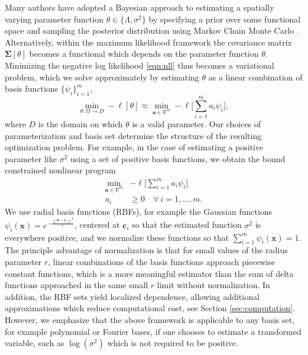 \documentclass{article}
\newcommand{\norm}[1]{\left\lVert#1\right\rVert}
\newcommand{\R}{\mathbb{R}}
\numberwithin{equation}{section}
\newcommand{\cm}{\bm{\Sigma}}
\newcommand{\x}{\bm{x}}
\newcommand{\a}{\bm{a}}
\renewcommand{\c}{\bm{c}}
\begin{document}
Many authors have adopted a Bayesian approach to estimating a spatially varying parameter function $\theta \in \{\Lambda, \sigma^2\}$ by specifying a prior over some functional space and sampling the posterior distribution using Markov Chain Monte Carlo \cite{risser2015regression, gibbs1997bayesian, paciorek2004nonstationary, paciorek2006spatial, higdon1998process}. Alternatively, within the maximum likelihood framework the covariance matrix $\cm[\theta]$ becomes a functional which depends on the parameter function $\theta$. Minimizing the negative log likelihood \ref{eqn:nll} thus becomes a variational problem, which we solve approximately by estimating $\theta$ as a linear combination of basis functions $\{ \psi_i\}_{i=1}^m$,
\begin{equation}
  \min_{\theta : \Omega \to D} -\ell[\theta] \approx \min_{\a \in \R^m} -\ell\Bigg[\sum_{i=1}^m a_i \psi_i\Bigg],
  \label{eqn:var}
\end{equation}
where $D$ is the domain on which $\theta$ is a valid parameter. Our choices of parameterization and basis set determine the structure of the resulting optimization problem. For example, in the case of estimating a positive parameter like $\sigma^2$ using a set of positive basis functions, we obtain the bound constrained nonlinear program
\begin{equation}
  \begin{aligned}
    \min_{\a \in \R^m} & -\ell\Bigg[ \sum_{i=1}^m a_i \psi_i \Bigg] \\
    a_i & \geq 0 \quad \forall \ i=1,...,m.
    \label{eqn:opt}
  \end{aligned}
\end{equation}
We use radial basis functions (RBFs), for example the Gaussian functions $\psi_i(\x) = e^{-\frac{\norm{\x - \c_i}^2}{r}}$, centered at $\c_i$ so that the estimated function $\sigma^2$ is everywhere positive, and we normalize these functions so that $\sum_{i=1}^m \psi_i(\x) = 1$. The principle advantage of normalization is that for small values of the radius parameter $r$, linear combinations of the basis functions approach piecewise constant functions, which is a more meaningful estimator than the sum of delta functions approached in the same small $r$ limit without normalization. In addition, the RBF sets yield localized dependence, allowing additional approximations which reduce computational cost, see Section \ref{sec:computation}. However, we emphasize that the above framework is applicable to any basis set, for example polynomial or Fourier bases, if one chooses to estimate a transformed variable, such as $\log(\sigma^2)$ which is not required to be positive.
\end{document}
